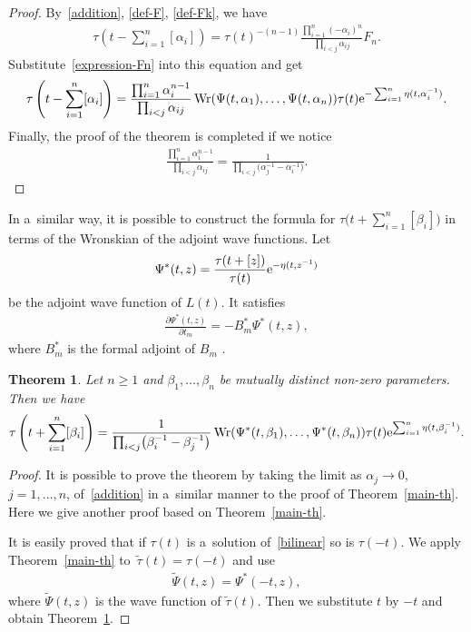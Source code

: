 \documentclass[10pt,a4paper]{amsart}
\numberwithin{equation}{section}
\newtheorem{Theorem}{Theorem}[section]
\theoremstyle{definition}
\begin{document}
\begin{proof}
By~\eqref{addition}, \eqref{def-F}, \eqref{def-Fk}, we have
\begin{gather*}
\tau\left(t-\sum_{i=1}^n[\alpha_i]\right)
=
\tau(t)^{-(n-1)}\frac{\prod_{i=1}^n (-\alpha_i)^n}{\prod_{i<j}\alpha_{ij}}F_n.
\end{gather*}
Substitute~\eqref{expression-Fn} into this equation and get
\begin{gather*}
\tau\left(t-\sum_{i=1}^n[\alpha_i]\right)
=
\frac{\prod_{i=1}^{n}\alpha_i^{n-1}}{\prod_{i<j}\alpha_{ij}}
\operatorname{Wr}(\Psi(t,\alpha_1),\dots ,\Psi(t,\alpha_n))\tau(t)
{\rm e}^{-\sum_{i=1}^n\eta(t,\alpha_i^{-1})}.
\nonumber
\end{gather*}
Finally, the proof of the theorem is completed if we notice
\begin{gather*}
\frac{\prod_{i=1}^{n}\alpha_i^{n-1}}{\prod_{i<j}\alpha_{ij}}
=
\frac{1}{\prod_{i<j}\bigl(\alpha_j^{-1}-\alpha_i^{-1}\bigr)}.\tag*{\qed}
\end{gather*} \renewcommand{\qed}{}
\end{proof}

In a~similar way, it is possible to construct the formula for
 $\tau\bigl(t+\sum_{i=1}^n[\beta_i]\bigr)$ in terms of the
Wronskian of the adjoint wave functions. Let
\begin{gather*}
\Psi^\ast(t,z)=\frac{\tau(t+[z])}{\tau(t)}{\rm e}^{-\eta(t,z^{-1})}
\end{gather*}
be the adjoint wave function of $L(t)$. It satisfies
\begin{gather*}
\frac{\partial \Psi^\ast(t,z)}{\partial t_m}=-B_m^\ast \Psi^\ast(t,z),
\end{gather*}
where $B_m^\ast$ is the formal adjoint of $B_m$ \cite{DJKM}.



\begin{Theorem}\label{main-th-2}
Let $n\geq 1$ and $\beta_1,\dots ,\beta_n$ be mutually distinct non-zero parameters.
 Then we have
\begin{gather*}
\tau\left(t+\sum_{i=1}^n[\beta_i]\right)=\frac{1}{\prod_{i<j}\bigl(\beta_i^{-1}-\beta_j^{-1}\bigr)}
\operatorname{Wr}(\Psi^\ast(t,\beta_1),\dots ,\Psi^\ast(t,\beta_n))\tau(t){\rm e}^{\sum_{i=1}^n\eta(t,\beta_i^{-1})}.
\end{gather*}
\end{Theorem}


\begin{proof} It is possible to prove the theorem by taking the limit as $\alpha_j\to 0$, $j=1,\dots ,n$, of~\eqref{addition} in a~similar manner to the proof of Theorem~\ref{main-th}.
Here we give another proof based on Theorem~\ref{main-th}.

It is easily proved that if $\tau(t)$ is a~solution of~\eqref{bilinear} so is $\tau(-t)$.
We apply Theorem~\ref{main-th} to~${\tilde{\tau}(t)=\tau(-t)}$ and use
\begin{gather}
\tilde{\Psi}(t,z)=\Psi^\ast(-t,z),
\label{tilde-psi-trf}
\end{gather}
where $\tilde{\Psi}(t,z)$ is the wave function of $\tilde{\tau}(t)$.
Then we substitute $t$ by $-t$ and obtain Theorem~\ref{main-th-2}.
\end{proof}
\end{document}
